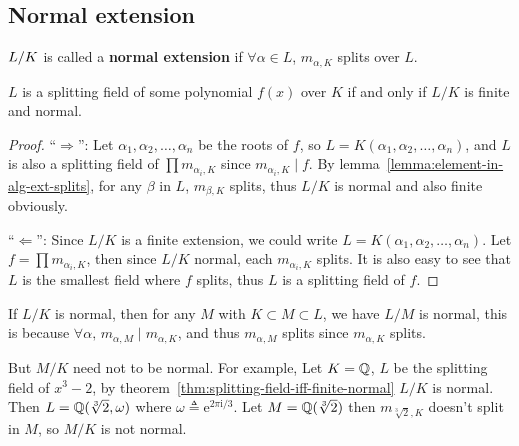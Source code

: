 \subsection{Normal extension}

\begin{definition}
  ${L}/{K}$ is called a {\bf normal extension}
  if $\forall \alpha \in L$, $m_{\alpha, K}$ splits over $L$.
\end{definition}

\begin{theorem} \label{thm:splitting-field-iff-finite-normal}
  $L$ is a splitting field of some polynomial $f(x)$ over $K$ if
  and only if $L/K$ is finite and normal.

  \begin{proof}
    ``$\Rightarrow$'': Let $\alpha_1, \alpha_2, \dots, \alpha_n$ be the roots of $f$,
    so $L = K(\alpha_1, \alpha_2, \dots, \alpha_n)$, and $L$ is also a splitting field
    of $\prod m_{\alpha_i, K}$ since $m_{\alpha_i, K} \mid f$. By lemma~\ref{lemma:element-in-alg-ext-splits},
    for any $\beta$ in $L$, $m_{\beta, K}$ splits, thus $L/K$ is normal and also finite obviously.

    ``$\Leftarrow$'': Since $L/K$ is a finite extension, we could write
    $L = K(\alpha_1, \alpha_2, \dots, \alpha_n)$. Let $f = \prod m_{\alpha_i, K}$, then
    since $L/K$ normal, each $m_{\alpha_i, K}$ splits. It is also easy to see that $L$
    is the smallest field where $f$ splits, thus $L$ is a splitting field of $f$.
  \end{proof}
\end{theorem}

\begin{remark}
  If $L/K$ is normal, then for any $M$ with $K \subset M \subset L$, we have $L/M$ is normal,
  this is because $\forall \alpha, \, m_{\alpha, M} \mid m_{\alpha, K}$, and thus
  $m_{\alpha, M}$ splits since $m_{\alpha, K}$ splits.

  But $M/K$ need not to be normal. For example, Let $K = \mathbb{Q}$, $L$ be the splitting field of $x^3 - 2$,
  by theorem~\ref{thm:splitting-field-iff-finite-normal} $L/K$ is normal.
  Then $L = \mathbb{Q}(\sqrt[3]{2}, \omega)$ where $\omega \triangleq \mathrm{e}^{2 \pi \mathrm{i} / 3}$.
  Let $M = \mathbb{Q}(\sqrt[3]{2})$ then $m_{\sqrt[3]{2}, K}$ doesn't split in $M$, so $M/K$ is not normal.
\end{remark}

